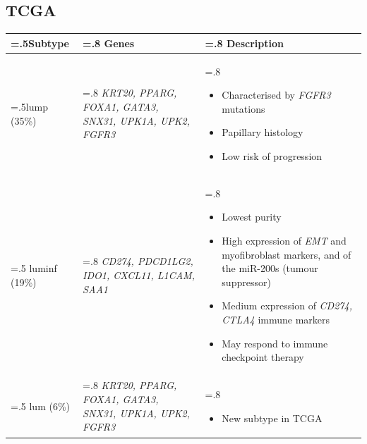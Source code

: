 \subsection{TCGA}

\begin{table}[H]
    \centering
    \small
    \begin{tabularx}{\textwidth}{ >{\hsize=.5\hsize}X |>{\hsize=.8\hsize}X |>{\hsize=.8\hsize}X
    }
    \toprule
    Subtype & Genes & Description \\
    \midrule
    \acrlong{lump} (35\%) & \textit{KRT20, PPARG, FOXA1, GATA3, SNX31, UPK1A, UPK2, FGFR3} & 
    \begin{itemize}[leftmargin=*, nosep, after=\vspace{-\baselineskip}, before=\vspace{-.6\baselineskip}]
        \item Characterised by \textit{FGFR3} mutations
        \item Papillary histology
        \item Low risk of progression
    \end{itemize} \\
    \midrule
    \acrlong{luminf} (19\%) & \textit{CD274, PDCD1LG2, IDO1, CXCL11, L1CAM, SAA1} & 
    \begin{itemize}[leftmargin=*, nosep, after=\vspace{-\baselineskip}, before=\vspace{-.6\baselineskip}]
        \item Lowest purity
        \item High expression of \textit{EMT} and myofibroblast markers, and of the miR-200s (tumour suppressor)
        \item Medium expression of \textit{CD274, CTLA4} immune markers
        \item May respond to immune checkpoint therapy
    \end{itemize} \\
    \midrule
    \acrlong{lum}  (6\%) & \textit{KRT20, PPARG, FOXA1, GATA3, SNX31, UPK1A, UPK2, FGFR3} & 
    \begin{itemize}[leftmargin=*, nosep, after=\vspace{-\baselineskip}, before=\vspace{-.6\baselineskip}]
        \item New subtype in TCGA
    \end{itemize} \\
    \midrule

\end{tabularx}
\end{table}
